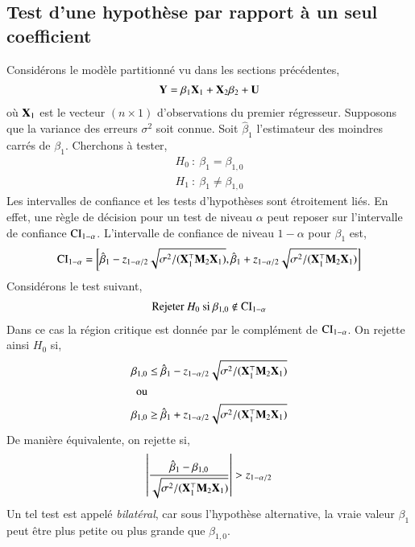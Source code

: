 \documentclass[10pt, reqno]{amsart}
\begin{document}
\subsection{Test d'une hypothèse par rapport à un seul coefficient}
Considérons le modèle partitionné vu dans les sections précédentes,
\begin{align*}
\mathbf Y = \beta_1\mathbf X_1 + \mathbf X_2\beta_2 + \mathbf U
\end{align*}
où $\mathbf X_1$ est le vecteur $(n\times 1)$ d'observations du premier régresseur. Supposons que la variance des erreurs $\sigma^2$ soit connue. Soit $\hat{\beta}_1$ l'estimateur des moindres carrés de $\beta_1$.  Cherchons à tester,
\begin{align}
H_0 \ : \  \beta_1 = \beta_{1, 0}\nonumber\\
H_1 \ : \  \beta_1 \neq \beta_{1, 0}
\label{eq34}
\end{align}
Les intervalles de confiance et les tests d'hypothèses sont étroitement liés. En effet, une règle de décision pour un test de niveau $\alpha$ peut reposer  sur l'intervalle de confiance $\mathrm{CI}_{1-\alpha}$. L'intervalle de confiance de niveau $1-\alpha$ pour $\beta_1$ est,
\begin{align*}
\mathrm{CI}_{1-\alpha} = \left[ \hat{\beta}_1 - z_{1 - \alpha/2}\sqrt{\sigma^2/(\mathbf X_1^\top\mathbf M_2\mathbf X_1)},  \hat{\beta}_1 + z_{1 - \alpha/2}\sqrt{\sigma^2/(\mathbf X_1^\top\mathbf M_2\mathbf X_1)}\right]
\end{align*}
Considérons le test suivant,
\begin{align*}
\textrm{Rejeter} \ H_0 \  \textrm{si} \ \beta_{1,0} \notin \mathrm{CI}_{1-\alpha}
\end{align*}
Dans ce cas la région critique est donnée par le complément de $ \mathrm{CI}_{1-\alpha}$. On rejette ainsi $H_0$ si,
\begin{align*}
\beta_{1,0}&\leq  \hat{\beta}_1 - z_{1 - \alpha/2}\sqrt{\sigma^2/(\mathbf X_1^\top\mathbf M_2\mathbf X_1)}\\
\textrm{ou}&\\
\beta_{1,0}&\geq  \hat{\beta}_1 + z_{1 - \alpha/2}\sqrt{\sigma^2/(\mathbf X_1^\top\mathbf M_2\mathbf X_1)}
\end{align*}
De manière équivalente, on rejette si,
\begin{align}
\left\vert {\frac{\hat{\beta}_1 - \beta_{1,0}}{ \sqrt{\sigma^2/(\mathbf X_1^\top\mathbf M_2\mathbf X_1)}}} \right\vert > z_{1-\alpha/2}
\label{eq35}
\end{align}
Un tel test est appelé \emph{bilatéral}, car sous l'hypothèse alternative, la vraie valeur $\beta_1$ peut être plus petite ou plus grande que $\beta_{1,0}$.\\
\end{document}

